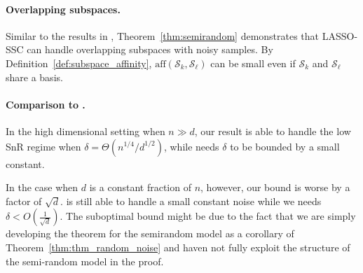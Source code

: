 \documentclass[12pt,heading]{ctexbook}
\begin{document}
\paragraph{Overlapping subspaces.}
Similar to the results in \cite{soltanolkotabi2011geometric}, Theorem~\ref{thm:semirandom} demonstrates that LASSO-SSC can handle overlapping subspaces with noisy samples. By Definition~\ref{def:subspace_affinity}, $\mathrm{aff}(\mathcal{S}_k,\mathcal{S}_{\ell})$ can be small even if $\mathcal{S}_k$ and $\mathcal{S}_{\ell}$ share a basis.

\paragraph{Comparison to \cite{soltanolkotabi2013robust}.}
In the high dimensional setting when $n\gg d$, our result is able to handle the low SnR regime when $\delta = \Theta(n^{1/4}/d^{1/2})$, while \cite{soltanolkotabi2013robust} needs $\delta$ to be bounded by a small constant.

In the case when $d$ is a constant fraction of $n$, however, our bound is worse by a factor of $\sqrt{d}$. \cite{soltanolkotabi2013robust} is still able to handle a small constant noise while we needs $\delta < O(\frac{1}{\sqrt{d}})$. The suboptimal bound might be due to the fact that we are simply developing the theorem for the semirandom model as a corollary of Theorem~\ref{thm:thm_random_noise} and haven not fully exploit the structure of the semi-random model in the proof.

\end{document}
